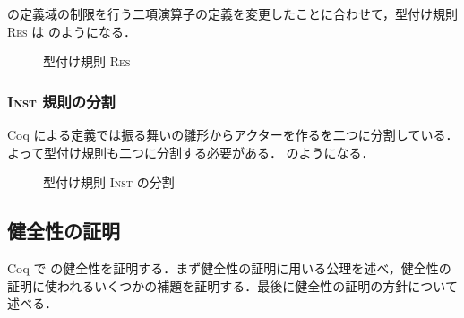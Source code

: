 \tmp の定義域の制限を行う二項演算子の定義を変更したことに合わせて，型付け規則 \textsc{Res} は  のようになる．

\begin{figure*}[t]
  \caption{型付け規則 \textsc{Res}}
  \label{api:res_rule}
\end{figure*}

\subsubsection{\textsc{Inst} 規則の分割}

Coq による定義では振る舞いの雛形からアクターを作る\conf を二つに分割している．よって型付け規則も二つに分割する必要がある． のようになる．

\begin{figure*}[t]
  \vspace{14pt}
  \caption{型付け規則 \textsc{Inst} の分割}
  \label{api:inst_rule}
\end{figure*}





\subsection{健全性の証明}

Coq で \api の健全性を証明する．まず健全性の証明に用いる公理を述べ，健全性の証明に使われるいくつかの補題を証明する．最後に健全性の証明の方針について述べる．


